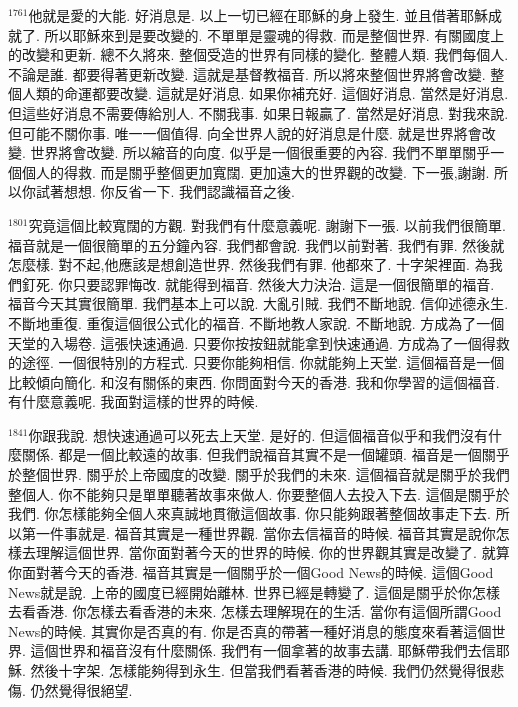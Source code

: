\documentclass{book}
\begin{document}
$^{1761}$他就是愛的大能.
好消息是.
以上一切已經在耶穌的身上發生.
並且借著耶穌成就了.
所以耶穌來到是要改變的.
不單單是靈魂的得救.
而是整個世界.
有關國度上的改變和更新.
總不久將來.
整個受造的世界有同樣的變化.
整體人類.
我們每個人.
不論是誰.
都要得著更新改變.
這就是基督教福音.
所以將來整個世界將會改變.
整個人類的命運都要改變.
這就是好消息.
如果你補充好.
這個好消息.
當然是好消息.
但這些好消息不需要傳給別人.
不關我事.
如果日報贏了.
當然是好消息.
對我來說.
但可能不關你事.
唯一一個值得.
向全世界人說的好消息是什麼.
就是世界將會改變.
世界將會改變.
所以縮音的向度.
似乎是一個很重要的內容.
我們不單單關乎一個個人的得救.
而是關乎整個更加寬闊.
更加遠大的世界觀的改變.
下一張,謝謝.
所以你試著想想.
你反省一下.
我們認識福音之後.

$^{1801}$究竟這個比較寬闊的方觀.
對我們有什麼意義呢.
謝謝下一張.
以前我們很簡單.
福音就是一個很簡單的五分鐘內容.
我們都會說.
我們以前對著.
我們有罪.
然後就怎麼樣.
對不起,他應該是想創造世界.
然後我們有罪.
他都來了.
十字架裡面.
為我們釘死.
你只要認罪悔改.
就能得到福音.
然後大力決治.
這是一個很簡單的福音.
福音今天其實很簡單.
我們基本上可以說.
大亂引賊.
我們不斷地說.
信仰述德永生.
不斷地重復.
重復這個很公式化的福音.
不斷地教人家說.
不斷地說.
方成為了一個天堂的入場卷.
這張快速通過.
只要你按按鈕就能拿到快速通過.
方成為了一個得救的途徑.
一個很特別的方程式.
只要你能夠相信.
你就能夠上天堂.
這個福音是一個比較傾向簡化.
和沒有關係的東西.
你問面對今天的香港.
我和你學習的這個福音.
有什麼意義呢.
我面對這樣的世界的時候.

$^{1841}$你跟我說.
想快速通過可以死去上天堂.
是好的.
但這個福音似乎和我們沒有什麼關係.
都是一個比較遠的故事.
但我們說福音其實不是一個罐頭.
福音是一個關乎於整個世界.
關乎於上帝國度的改變.
關乎於我們的未來.
這個福音就是關乎於我們整個人.
你不能夠只是單單聽著故事來做人.
你要整個人去投入下去.
這個是關乎於我們.
你怎樣能夠全個人來真誠地貫徹這個故事.
你只能夠跟著整個故事走下去.
所以第一件事就是.
福音其實是一種世界觀.
當你去信福音的時候.
福音其實是說你怎樣去理解這個世界.
當你面對著今天的世界的時候.
你的世界觀其實是改變了.
就算你面對著今天的香港.
福音其實是一個關乎於一個Good News的時候.
這個Good News就是說.
上帝的國度已經開始離林.
世界已經是轉變了.
這個是關乎於你怎樣去看香港.
你怎樣去看香港的未來.
怎樣去理解現在的生活.
當你有這個所謂Good News的時候.
其實你是否真的有.
你是否真的帶著一種好消息的態度來看著這個世界.
這個世界和福音沒有什麼關係.
我們有一個拿著的故事去講.
耶穌帶我們去信耶穌.
然後十字架.
怎樣能夠得到永生.
但當我們看著香港的時候.
我們仍然覺得很悲傷.
仍然覺得很絕望.
\end{document}
